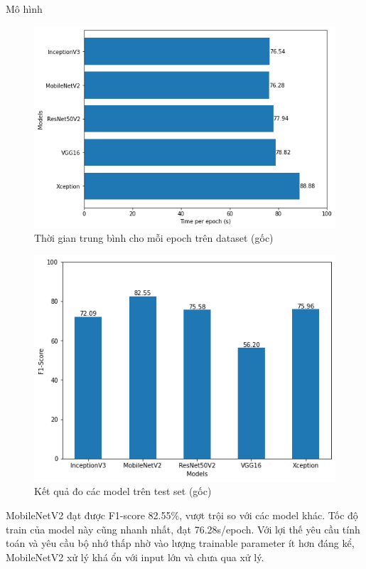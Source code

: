 \documentclass{beamer}
\begin{document}
\begin{frame}[allowframebreaks]{Mô hình}
	\framebreak

	\begin{figure}[H]
		\centering
		\includegraphics[scale=0.5]{images/original_time}
		\caption{Thời gian trung bình cho mỗi epoch trên dataset (gốc)}
	\end{figure}

	\begin{figure}[H]
		\centering
		\includegraphics[scale=0.5]{images/original_score}
		\caption{Kết quả đo các model trên test set (gốc)}
	\end{figure}

	MobileNetV2 đạt được F1-score 82.55\%, vượt trội so với các model khác. Tốc độ train của model này cũng nhanh nhất, đạt 76.28s/epoch. Với lợi thế yêu cầu tính toán và yêu cầu bộ nhớ thấp nhờ vào lượng trainable parameter ít hơn đáng kể, MobileNetV2 xử lý khá ổn với input lớn và chưa qua xử lý.


\end{frame}
\end{document}
